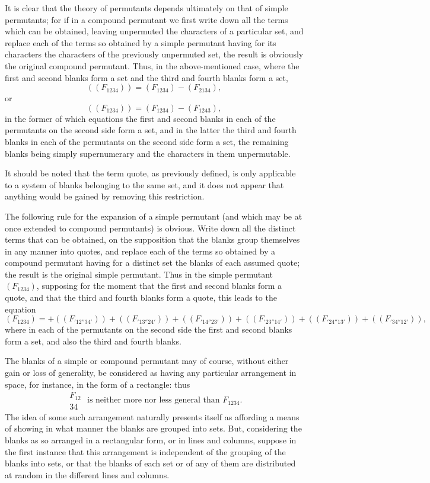 \documentclass[11pt,a4paper]{article}
\theoremstyle{plain}
\begin{document}
It is clear that the theory of permutants depends ultimately on that of simple permutants; for if in a compound permutant we first write down all the terms which can be obtained, leaving unpermuted the characters of a particular set, and replace each of the terms so obtained by a simple permutant having for its characters the characters of the previously unpermuted set, the result is obviously the original compound permutant. Thus, in the above-mentioned case, where the first and second blanks form a set and the third and fourth blanks form a set,
\[((F_{1234})) = (F_{1234}) - (F_{2134}),\]
or
\[((F_{1234})) = (F_{1234}) - (F_{1243}),\]
in the former of which equations the first and second blanks in each of the permutants on the second side form a set, and in the latter the third and fourth blanks in each of the permutants on the second side form a set, the remaining blanks being simply supernumerary and the characters in them unpermutable.

It should be noted that the term quote, as previously defined, is only applicable to a system of blanks belonging to the same set, and it does not appear that anything would be gained by removing this restriction.

The following rule for the expansion of a simple permutant (and which may be at once extended to compound permutants) is obvious. Write down all the distinct terms that can be obtained, on the supposition that the blanks group themselves in any manner into quotes, and replace each of the terms so obtained by a compound permutant having for a distinct set the blanks of each assumed quote; the result is the original simple permutant. Thus in the simple permutant $(F_{1234})$, supposing for the moment that the first and second blanks form a quote, and that the third and fourth blanks form a quote, this leads to the equation
\[(F_{1234}) = +((F_{'12''34'})) + ((F_{'13''24'})) + ((F_{'14''23'})) + ((F_{'23''14'})) + ((F_{'24''13'})) + ((F_{'34''12'})),\]
where in each of the permutants on the second side the first and second blanks form a set, and also the third and fourth blanks.

The blanks of a simple or compound permutant may of course, without either gain or loss of generality, be considered as having any particular arrangement in space, for instance, in the form of a rectangle: thus
\[\begin{matrix} F_{12} \\ 34 \end{matrix} \text{ is neither more nor less general than } F_{1234}.\]
The idea of some such arrangement naturally presents itself as affording a means of showing in what manner the blanks are grouped into sets. But, considering the blanks as so arranged in a rectangular form, or in lines and columns, suppose in the first instance that this arrangement is independent of the grouping of the blanks into sets, or that the blanks of each set or of any of them are distributed at random in the different lines and columns.
\end{document}

